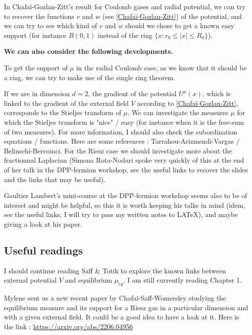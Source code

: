 \documentclass[a4paper,12pt]{report}
\begin{document}
In Chafaï-Gozlan-Zitt's result for Coulomb gases and radial potential, we can try to recover the functions $v$ and $w$ (see \ref{Chafaï-Gozlan-Zitt}) of the potential, and we can try to see which kind of $v$ and $w$ should we chose to get a known easy support (for instance $B(0, 1)$ instead of the ring $\{x : r_0 \leq |x| \leq R_0\}$).
\vspace{0.5cm}

\textbf{We can also consider the following developments.}
\vspace{0.5cm}

To get the support of $\mu$ in the radial Coulomb case, as we know that it should be a ring, we can try to make use of the single ring theorem.
\vspace{0.5cm}

If we are in dimension $d = 2$, the gradient of the potential $U^{\mu}(x)$, which is linked to the gradient of the external field $V$ according to \ref{Chafaï-Gozlan-Zitt},  corresponds to the Stieljes transform of $\mu$. We can investigate the measures $\mu$ for which the Stieljes transform is "nice" / easy (for instance when it is the free-sum of two measures). For more information, I should also check the subordination equations / functions. Here are some references : Tarrahou-Arizmendi-Vargas / Belinschi-Bercoinci. For the Riesz case we should investigate more about the fractionnal Laplacian (Simona Rota-Nodari spoke very quickly of this at the end of her talk in the DPP-fermion workshop, see the useful links to recover the slides and the links that may be useful).
\vspace{0.5cm}

Gaultier Lambert's mini-course at the DPP-fermion workshop seems also to be of interest and might be helpful, so this it is worth keeping his talks in mind (idem, see the useful links, I will try to pass my written notes to LATeX), and maybe giving a look at his paper.



\subsection*{Useful readings}

I should continue reading Saff \& Totik \cite{saff-totik} to explore the known links between external potential $V$ and equilibrium $\mu_{eq}$. I am still currently reading Chapter 1.
\vspace{0.5cm}

Mylene sent us a new recent paper by Chafaï-Saff-Womersley \cite{chafai-saff-womersley} studying the equilibrium measure and its support for a Riesz gas in a particular dimension and with a given external field. It could be a good idea to have a look at it. Here is the link : \href{https://arxiv.org/abs/2206.04956}{https://arxiv.org/abs/2206.04956}
\end{document}
